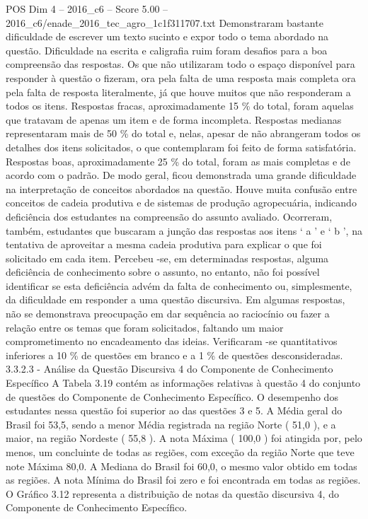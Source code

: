 \begin{textsample}{POS Dim 4 – 2016\_c6 – Score 5.00 – 2016\_c6/enade\_2016\_tec\_agro\_1c1f311707.txt}
Demonstraram bastante dificuldade de escrever um texto sucinto e expor todo o tema abordado na questão.
Dificuldade na escrita e caligrafia ruim foram desafios para a boa compreensão das respostas.
Os que não utilizaram todo o espaço disponível para responder à questão o fizeram, ora pela falta de uma resposta mais completa ora pela falta de resposta literalmente, já que houve muitos que não responderam a todos os itens.
Respostas fracas, aproximadamente 15 \% do total, foram aquelas que tratavam de apenas um item e de forma incompleta.
Respostas medianas representaram mais de 50 \% do total e, nelas, apesar de não abrangeram todos os detalhes dos itens solicitados, o que contemplaram foi feito de forma satisfatória.
Respostas boas, aproximadamente 25 \% do total, foram as mais completas e de acordo com o padrão.
De modo geral, ficou demonstrada uma grande dificuldade na interpretação de conceitos abordados na questão.
Houve muita confusão entre conceitos de cadeia produtiva e de sistemas de produção agropecuária, indicando deficiência dos estudantes na compreensão do assunto avaliado.
Ocorreram, também, estudantes que buscaram a junção das respostas aos itens ‘ a ’ e ‘ b ’, na tentativa de aproveitar a mesma cadeia produtiva para explicar o que foi solicitado em cada item.
Percebeu -se, em determinadas respostas, alguma deficiência de conhecimento sobre o assunto, no entanto, não foi possível identificar se esta deficiência advém da falta de conhecimento ou, simplesmente, da dificuldade em responder a uma questão discursiva.
Em algumas respostas, não se demonstrava preocupação em dar sequência ao raciocínio ou fazer a relação entre os temas que foram solicitados, faltando um maior comprometimento no encadeamento das ideias.
Verificaram -se quantitativos inferiores a 10 \% de questões em branco e a 1 \% de questões desconsideradas. 3.3.2.3 - Análise da Questão Discursiva 4 do Componente de Conhecimento Específico A Tabela 3.19 contém as informações relativas à questão 4 do conjunto de questões do Componente de Conhecimento Específico.
O desempenho dos estudantes nessa questão foi superior ao das questões 3 e 5.
A Média geral do Brasil foi 53,5, sendo a menor Média registrada na região Norte ( 51,0 ), e a maior, na região Nordeste ( 55,8 ).
A nota Máxima ( 100,0 ) foi atingida por, pelo menos, um concluinte de todas as regiões, com exceção da região Norte que teve note Máxima 80,0.
A Mediana do Brasil foi 60,0, o mesmo valor obtido em todas as regiões.
A nota Mínima do Brasil foi zero e foi encontrada em todas as regiões.
O Gráfico 3.12 representa a distribuição de notas da questão discursiva 4, do Componente de Conhecimento Específico.

\end{textsample}

